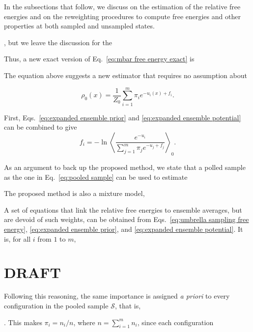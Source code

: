 \documentclass[aip,jcp,preprint,amsmath,amssymb]{revtex4-1}
\begin{document}
In the subsections that follow, we discuss on the estimation of the relative free energies and on the reweighting procedures to compute free energies and other properties at both sampled and unsampled states.


, but we leave the discussion for the 




Thus, a new exact version of Eq.~\eqref{eq:mbar free energy exact} is

The equation above suggests a new estimator that requires no assumption about 


\begin{equation}
\rho_0(x) = \frac{1}{Z_0} \sum_{i=1}^m \pi_i e^{-u_i(x) + f_i}.
\end{equation}



First, Eqs.~\eqref{eq:expanded ensemble prior} and \eqref{eq:expanded ensemble potential} can be combined to give
\begin{equation}
\label{eq:mblock potential}
f_i = -\ln \left\langle \frac{e^{-u_i}}{\sum_{j=1}^m \pi_j e^{-u_j + f_j}} \right\rangle_0.
\end{equation}



As an argument to back up the proposed method, we state that a polled sample as the one in Eq.~\eqref{eq:pooled sample} can be used to estimate 

The proposed method is also a mixture model,  





A set of equations that link the relative free energies to ensemble averages, but are devoid of such weights, can be obtained from Eqs.~\eqref{eq:umbrella sampling free energy}, \eqref{eq:expanded ensemble prior}, and \eqref{eq:expanded ensemble potential}. It is, for all $i$ from $1$ to $m$,


\section{DRAFT}



Following this reasoning, the same importance is assigned \textit{a priori} to every configuration in the pooled sample $\mathcal S$, that is, 


. This makes $\pi_i = n_i/n$, where $n = \sum_{i=1}^m n_i$, since each configuration 
\end{document}
